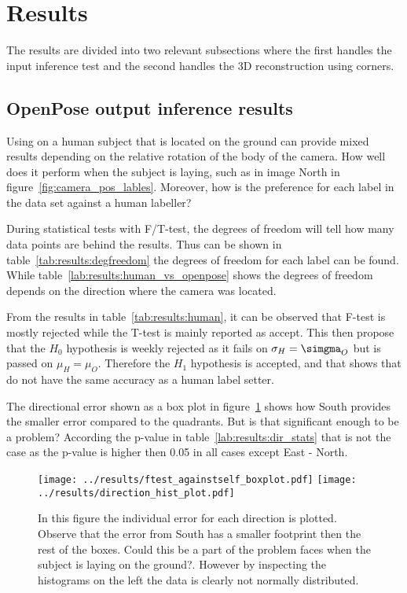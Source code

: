 \section{Results}\label{sec:results}


The results are divided into two relevant subsections where the first handles the input inference test and the second handles the 3D reconstruction using \aruco corners.
\subsection{OpenPose output inference results}%
\label{sub:res:op_inference}
Using \openpose{ } on a human subject that is located on the ground can provide mixed results depending on the relative rotation of the body of the camera.
How well does it perform when the subject is laying, such as in image North in figure~\ref{fig:camera_pos_lables}.
Moreover, how is the preference for each label in the \operpose data set against a human labeller?

During statistical tests with F/T-test, the degrees of freedom will tell how many data points are behind the results.
Thus can be shown in table~\ref{tab:results:degfreedom} the degrees of freedom for each label can be found.
While table~\ref{lab:results:human_vs_openpose} shows the degrees of freedom depends on the direction where the camera was located.

From the results in table~\ref{tab:results:human}, it can be observed that F-test is mostly rejected while the T-test is mainly reported as accept.
This then propose that the $H_0$ hypothesis is weekly rejected as it fails on $\sigma_H = \simgma_O$ but is passed on $\mu_H = \mu_O$.
Therefore the $H_1$ hypothesis is accepted, and that shows that \openpose{ } do not have the same accuracy as a human label setter.

The directional error shown as a box plot in figure~\ref{fig:results:dirbox} shows how South provides the smaller error compared to the quadrants.
But is that significant enough to be a problem?
According the p-value in table~\ref{lab:results:dir_stats} that is not the case as the p-value is higher then 0.05 in all cases except East - North.

\begin{figure}
\begin{center}
    \texttt{[image: ../results/ftest\_againstself\_boxplot.pdf]}
    \texttt{[image: ../results/direction\_hist\_plot.pdf]}
\end{center}
\caption{In this figure the individual error for each direction is plotted. Observe that the error from South has a smaller footprint then the rest of the boxes. Could this be a part of the problem \openpose faces when the subject is laying on the ground?. However by inspecting the histograms on the left the data is clearly not normally distributed. }
\label{fig:results:dirbox}
\end{figure}



